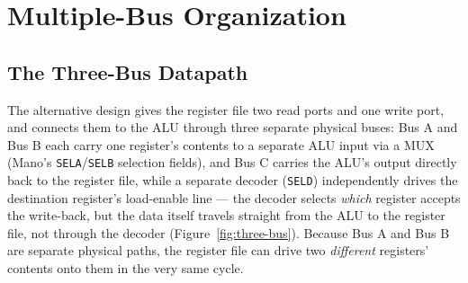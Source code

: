 \documentclass[11pt]{article}
\begin{document}
\section{Multiple-Bus Organization}
\label{sec:multi-bus}

\subsection{The Three-Bus Datapath}

The alternative design gives the register file two read ports and one write port, and connects them to the ALU through three separate physical buses: Bus A and Bus B each carry one register's contents to a separate ALU input via a MUX (Mano's \texttt{SELA}/\texttt{SELB} selection fields), and Bus C carries the ALU's output directly back to the register file, while a separate decoder (\texttt{SELD}) independently drives the destination register's load-enable line --- the decoder selects \emph{which} register accepts the write-back, but the data itself travels straight from the ALU to the register file, not through the decoder (Figure~\ref{fig:three-bus}). Because Bus A and Bus B are separate physical paths, the register file can drive two \emph{different} registers' contents onto them in the very same cycle.
\end{document}
